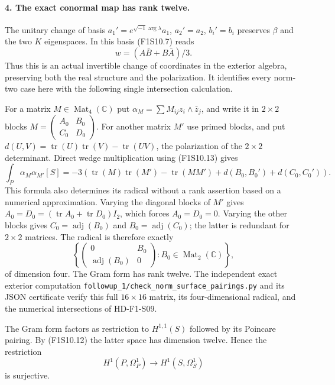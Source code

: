 \paragraph{4. The exact conormal map has rank twelve.}
The unitary change of basis
$a_1'=e^{\sqrt{-1}\arg\lambda}a_1$,
$a_2'=a_2$, $b_i'=b_i$ preserves $\beta$ and the two
$K$ eigenspaces. In this basis (F1S10.7) reads
\[
                         w=(A\bar B+B\bar A)/3.
 \tag{F1S10.13}
\]
Thus this is an actual invertible change of coordinates
in the exterior algebra, preserving both the real structure
and the polarization. It identifies every norm-two case
here with the following single intersection calculation.

For a matrix $M\in\operatorname{Mat}_4(\mathbb C)$ put
$\alpha_M=\sum M_{ij}z_i\wedge\bar z_j$, and write it
in $2\times2$ blocks $M=\left(\begin{smallmatrix}A_0&B_0\\C_0&D_0
\end{smallmatrix}\right)$. For another matrix $M'$ use
primed blocks, and put
$d(U,V)=\operatorname{tr}(U)\operatorname{tr}(V)-\operatorname{tr}(UV)$,
the polarization of the $2\times2$ determinant.
Direct wedge multiplication using (F1S10.13) gives
\[
 \int_P\alpha_M\alpha_{M'}[S]
 =-3\left(\operatorname{tr}(M)\operatorname{tr}(M')
          -\operatorname{tr}(MM')+d(B_0,B_0')+d(C_0,C_0')\right).
 \tag{F1S10.14}
\]
This formula also determines its radical without a rank
assertion based on a numerical approximation. Varying
the diagonal blocks of $M'$ gives
$A_0=D_0=(\operatorname{tr}A_0+\operatorname{tr}D_0)I_2$,
which forces $A_0=D_0=0$. Varying the other blocks gives
$C_0=\operatorname{adj}(B_0)$ and
$B_0=\operatorname{adj}(C_0)$; the latter is redundant
for $2\times2$ matrices. The radical is therefore exactly
\[
 \left\{\begin{pmatrix}0&B_0\\\operatorname{adj}(B_0)&0\end{pmatrix}:
                         B_0\in\operatorname{Mat}_2(\mathbb C)\right\},
 \tag{F1S10.15}
\]
of dimension four. The Gram form has rank twelve.
The independent exact exterior computation
\texttt{followup\_1/check\_norm\_surface\_pairings.py}
and its JSON certificate verify this full $16\times16$
matrix, its four-dimensional radical, and the numerical
intersections of HD-F1-S09.

The Gram form factors as restriction to $H^{1,1}(S)$
followed by its Poincare pairing. By (F1S10.12) the latter
space has dimension twelve. Hence the restriction
\[
                         H^1(P,\Omega_P^1)\longrightarrow
                         H^1(S,\Omega_S^1)
 \tag{F1S10.16}
\]
is surjective.

